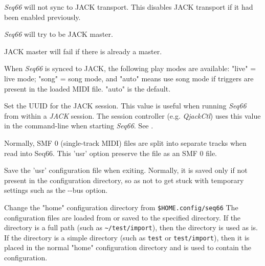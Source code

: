       \textsl{Seq66} will not sync to JACK transport.
      This disables JACK transport if it had been enabled previously.


      \textsl{Seq66} will try to be JACK master.


      JACK master will fail if there is already a master.


      When \textsl{Seq66} is synced to JACK, the following play modes
      are available: "live" = live mode; "song" = song mode, and "auto" means
      use song mode if triggers are present in the loaded MIDI file. "auto" is
      the default.


      Set the UUID for the JACK session.  This value is useful when
      running \textsl{Seq66} from within a \textsl{JACK} session.
      The session controller (e.g. \textsl{QjackCtl}) uses this value in the
      command-line when starting \textsl{Seq66}.
      See .

      Normally, SMF 0 (single-track MIDI) files are split into separate tracks
      when read into Seq66.  This 'usr' option preserve the file as an SMF 0
      file.

      Save the 'usr' configuration file when exiting.
      Normally, it is saved only if not present in the configuration directory,
      so as not to get stuck with temporary settings such as the -{}-bus option.


      Change the "home" configuration directory from \texttt{\$HOME.config/seq66}
      The configuration files are loaded from or saved to the specified directory.
      If the directory is a full path (such as 
      \texttt{\textasciitilde/test/import}), then
      the directory is used as is.
      If the directory is a simple directory (such as \texttt{test}
      or \texttt{test/import}), then it
      is placed in the normal "home" configuration directory and is used
      to contain the configuration.

